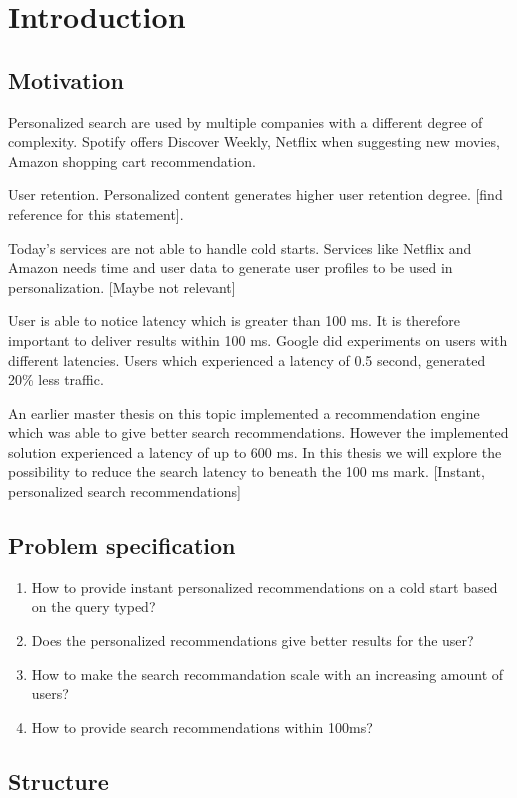 \chapter{Introduction}
\section{Motivation}
Personalized search are used by multiple companies with a different degree of complexity.
Spotify offers Discover Weekly, Netflix when suggesting new movies, Amazon shopping cart recommendation.

User retention. Personalized content generates higher user retention degree. [find reference for this statement].

Today's services are not able to handle cold starts.
Services like Netflix and Amazon needs time and user data to generate user profiles to be used in personalization. [Maybe not relevant]

User is able to notice latency which is greater than 100 ms. It is therefore important to deliver results within 100 ms.
Google did experiments on users with different latencies. Users which experienced a latency of 0.5 second, generated 20\% less traffic.

An earlier master thesis on this topic implemented a recommendation engine which was able to give better search recommendations.
However the implemented solution experienced a latency of up to 600 ms.
In this thesis we will explore the possibility to reduce the search latency to beneath the 100 ms mark. [Instant, personalized search recommendations]

\section{Problem specification}

\begin{enumerate}
  \item How to provide instant personalized recommendations on a cold start based on the query typed?
  \item Does the personalized recommendations give better results for the user?
  \item How to make the search recommandation scale with an increasing amount of users?
  \item How to provide search recommendations within 100ms?
\end{enumerate}

\section{Structure}
